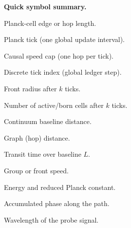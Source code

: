 \bigskip
\noindent\textbf{Quick symbol summary.}
\begin{description}[leftmargin=2.4em,labelsep=0.8em]
  \item[\(\ell_P\)] Planck-cell edge or hop length.
  \item[\(t_P\)] Planck tick (one global update interval).
  \item[\(c=\ell_P/t_P\)] Causal speed cap (one hop per tick).
  \item[\(k\)] Discrete tick index (global ledger step).
  \item[\(R(k)\)] Front radius after \(k\) ticks.
  \item[\(N(k)\)] Number of active/born cells after \(k\) ticks.
  \item[\(L\)] Continuum baseline distance.
  \item[\(d_G\)] Graph (hop) distance.
  \item[\(T(L)\)] Transit time over baseline \(L\).
  \item[\(v_g\)] Group or front speed.
  \item[\(E,\,\hbar\)] Energy and reduced Planck constant.
  \item[\(\Delta\phi\)] Accumulated phase along the path.
  \item[\(\lambda\)] Wavelength of the probe signal.
\end{description}

